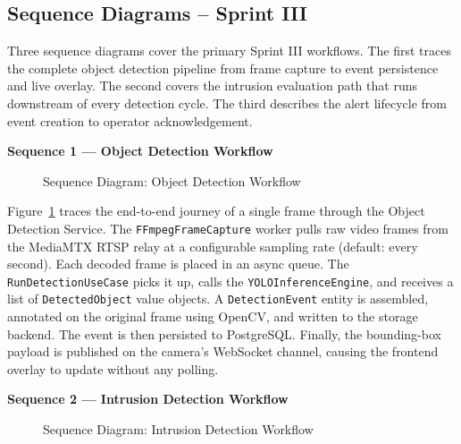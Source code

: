 \subsection{Sequence Diagrams -- Sprint III}
\label{subsec:s3_sequences}

\hspace{0.8cm}Three sequence diagrams cover the primary Sprint III workflows. The first traces the complete object detection pipeline from frame capture to event persistence and live overlay. The second covers the intrusion evaluation path that runs downstream of every detection cycle. The third describes the alert lifecycle from event creation to operator acknowledgement.

\textbf{Sequence 1 — Object Detection Workflow}

\begin{figure}[H]
\centering
{}
\caption{Sequence Diagram: Object Detection Workflow}
\label{fig:seq_s3_detection}
\end{figure}

\hspace{0.8cm}Figure~\ref{fig:seq_s3_detection} traces the end-to-end journey of a single frame through the Object Detection Service. The \texttt{FFmpegFrameCapture} worker pulls raw video frames from the MediaMTX RTSP relay at a configurable sampling rate (default: every second). Each decoded frame is placed in an async queue. The \texttt{RunDetectionUseCase} picks it up, calls the \texttt{YOLOInferenceEngine}, and receives a list of \texttt{DetectedObject} value objects. A \texttt{DetectionEvent} entity is assembled, annotated on the original frame using OpenCV, and written to the storage backend. The event is then persisted to PostgreSQL. Finally, the bounding-box payload is published on the camera's WebSocket channel, causing the frontend overlay to update without any polling.

\textbf{Sequence 2 — Intrusion Detection Workflow}

\begin{figure}[H]
\centering
{}
\caption{Sequence Diagram: Intrusion Detection Workflow}
\label{fig:seq_s3_intrusion}
\end{figure}

